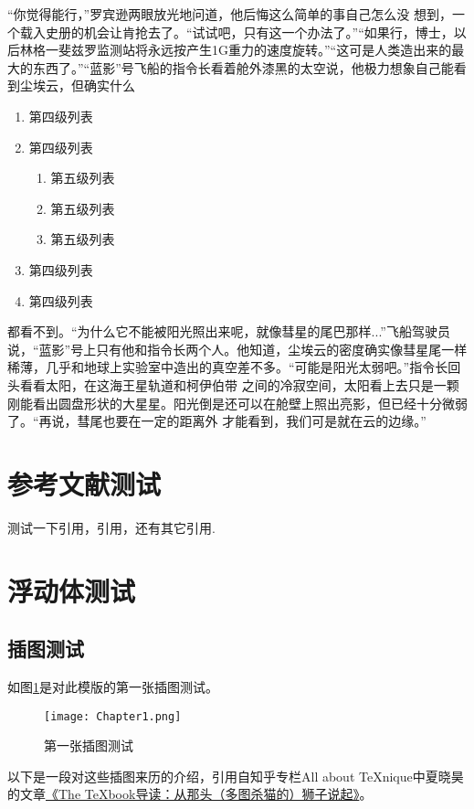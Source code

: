 “你觉得能行，”罗宾逊两眼放光地问道，他后悔这么简单的事自己怎么没 想到，一个载入史册的机会让肯抢去了。“试试吧，只有这一个办法了。”“如果行，博士，以后林格一斐兹罗监测站将永远按产生1G重力的速度旋转。”“这可是人类造出来的最大的东西了。”“蓝影”号飞船的指令长看着舱外漆黑的太空说，他极力想象自己能看到尘埃云，但确实什么
\begin{enumerate}
	\item 第四级列表
	\item 第四级列表
	\begin{enumerate}
		\item 第五级列表
		\item 第五级列表
		\item 第五级列表
	\end{enumerate}
	\item 第四级列表
	\item 第四级列表
\end{enumerate}
都看不到。“为什么它不能被阳光照出来呢，就像彗星的尾巴那样...”飞船驾驶员说，“蓝影”号上只有他和指令长两个人。他知道，尘埃云的密度确实像彗星尾一样稀薄，几乎和地球上实验室中造出的真空差不多。“可能是阳光太弱吧。”指令长回头看看太阳，在这海王星轨道和柯伊伯带 之间的冷寂空间，太阳看上去只是一颗刚能看出圆盘形状的大星星。阳光倒是还可以在舱壁上照出亮影，但已经十分微弱了。“再说，彗尾也要在一定的距离外 才能看到，我们可是就在云的边缘。”

\section{参考文献测试}
测试一下引用\cite{shi_chinas_2010}，引用\cite{shi2010china,hata2014soi,muhammad2011development}，还有其它引用\cite{shi2010china,muhammad2011development,lamport1994latex}.

\section{浮动体测试}
\subsection{插图测试}
如图\ref{fig:first_image_tset}是对此模版的第一张插图测试。

\begin{figure}[htbp]
	\centering
	\texttt{[image: Chapter1.png]}
	\caption{第一张插图测试}\label{fig:first_image_tset}
\end{figure}

以下是一段对这些插图来历的介绍，引用自知乎专栏All about TeXnique中夏晓昊的文章\href{http://zhuanlan.zhihu.com/LaTeX/19669122}{《The TeXbook导读：从那头（多图杀猫的）狮子说起》}。

